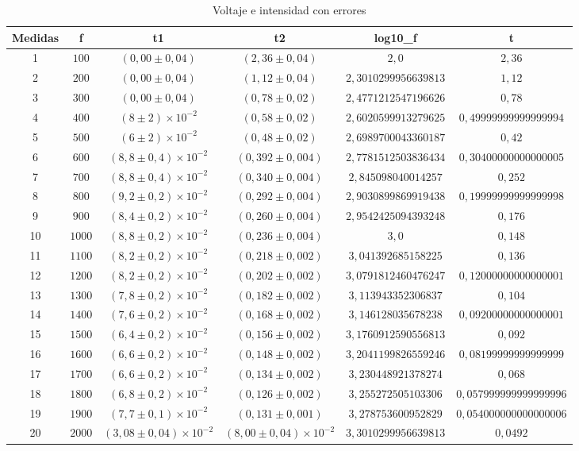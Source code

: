 \begin{table}[H]
\centering
\begin{tabular}{|c|c|c|c|c|c|}
\hline
Medidas & f & t1 & t2 & log10_f & t \\
\hline
1 & $100$ & $(0,00 \pm 0,04)$ & $(2,36 \pm 0,04)$ & $2,0$ & $2,36$ \\
2 & $200$ & $(0,00 \pm 0,04)$ & $(1,12 \pm 0,04)$ & $2,3010299956639813$ & $1,12$ \\
3 & $300$ & $(0,00 \pm 0,04)$ & $(0,78 \pm 0,02)$ & $2,4771212547196626$ & $0,78$ \\
4 & $400$ & $(8 \pm 2) \times 10^{-2}$ & $(0,58 \pm 0,02)$ & $2,6020599913279625$ & $0,49999999999999994$ \\
5 & $500$ & $(6 \pm 2) \times 10^{-2}$ & $(0,48 \pm 0,02)$ & $2,6989700043360187$ & $0,42$ \\
6 & $600$ & $(8,8 \pm 0,4) \times 10^{-2}$ & $(0,392 \pm 0,004)$ & $2,7781512503836434$ & $0,30400000000000005$ \\
7 & $700$ & $(8,8 \pm 0,4) \times 10^{-2}$ & $(0,340 \pm 0,004)$ & $2,845098040014257$ & $0,252$ \\
8 & $800$ & $(9,2 \pm 0,2) \times 10^{-2}$ & $(0,292 \pm 0,004)$ & $2,9030899869919438$ & $0,19999999999999998$ \\
9 & $900$ & $(8,4 \pm 0,2) \times 10^{-2}$ & $(0,260 \pm 0,004)$ & $2,9542425094393248$ & $0,176$ \\
10 & $1000$ & $(8,8 \pm 0,2) \times 10^{-2}$ & $(0,236 \pm 0,004)$ & $3,0$ & $0,148$ \\
11 & $1100$ & $(8,2 \pm 0,2) \times 10^{-2}$ & $(0,218 \pm 0,002)$ & $3,041392685158225$ & $0,136$ \\
12 & $1200$ & $(8,2 \pm 0,2) \times 10^{-2}$ & $(0,202 \pm 0,002)$ & $3,0791812460476247$ & $0,12000000000000001$ \\
13 & $1300$ & $(7,8 \pm 0,2) \times 10^{-2}$ & $(0,182 \pm 0,002)$ & $3,113943352306837$ & $0,104$ \\
14 & $1400$ & $(7,6 \pm 0,2) \times 10^{-2}$ & $(0,168 \pm 0,002)$ & $3,146128035678238$ & $0,09200000000000001$ \\
15 & $1500$ & $(6,4 \pm 0,2) \times 10^{-2}$ & $(0,156 \pm 0,002)$ & $3,1760912590556813$ & $0,092$ \\
16 & $1600$ & $(6,6 \pm 0,2) \times 10^{-2}$ & $(0,148 \pm 0,002)$ & $3,2041199826559246$ & $0,08199999999999999$ \\
17 & $1700$ & $(6,6 \pm 0,2) \times 10^{-2}$ & $(0,134 \pm 0,002)$ & $3,230448921378274$ & $0,068$ \\
18 & $1800$ & $(6,8 \pm 0,2) \times 10^{-2}$ & $(0,126 \pm 0,002)$ & $3,255272505103306$ & $0,057999999999999996$ \\
19 & $1900$ & $(7,7 \pm 0,1) \times 10^{-2}$ & $(0,131 \pm 0,001)$ & $3,278753600952829$ & $0,054000000000000006$ \\
20 & $2000$ & $(3,08 \pm 0,04) \times 10^{-2}$ & $(8,00 \pm 0,04) \times 10^{-2}$ & $3,3010299956639813$ & $0,0492$ \\
\hline
\end{tabular}
\caption{Voltaje e intensidad con errores}
\label{tab:VI}
\end{table}